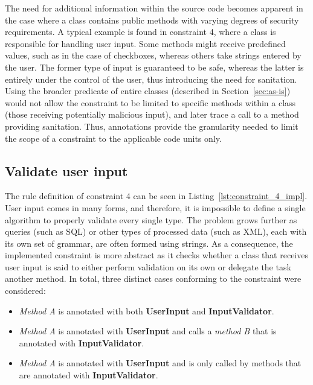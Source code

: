 The need for additional information within the source code becomes apparent in the case where a class contains public methods with varying degrees of security requirements. A typical example is found in constraint 4, where a class is responsible for handling user input. Some methods might receive predefined values, such as in the case of checkboxes, whereas others take strings entered by the user. The former type of input is guaranteed to be safe, whereas the latter is entirely under the control of the user, thus introducing the need for sanitation. Using the broader predicate of entire classes (described in Section~\ref{sec:as-is}) would not allow the constraint to be limited to specific methods within a class (those receiving potentially malicious input), and later trace a call to a method providing sanitation. Thus, annotations provide the granularity needed to limit the scope of a constraint to the applicable code units only.

\subsection{Validate user input}
The rule definition of constraint 4 can be seen in Listing~\ref{lst:constraint_4_impl}.
User input comes in many forms, and therefore, it is impossible to define a single algorithm to properly validate every single type. The problem grows further as queries (such as SQL) or other types of processed data (such as XML), each with its own set of grammar, are often formed using strings. As a consequence, the implemented constraint is more abstract as it checks whether a class that receives user input is said to either perform validation on its own or delegate the task another method. In total, three distinct cases conforming to the constraint were considered: 

\begin{itemize}
    \item \textit{Method A} is annotated with both \textbf{UserInput} and \textbf{InputValidator}.
    
    \item \textit{Method A} is annotated with \textbf{UserInput} and calls a \textit{method B} that is annotated with \textbf{InputValidator}.
    
    \item \textit{Method A} is annotated with \textbf{UserInput} and is only called by methods that are annotated with \textbf{InputValidator}.
\end{itemize}

